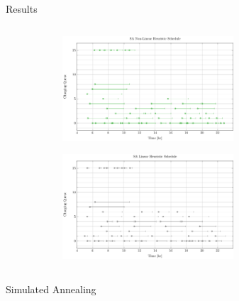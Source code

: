 \documentclass[aspectratio=169,dvipsnames]{beamer}
\begin{document}
\begin{frame}[label={sec:org5001cf8}]{Results}
\begin{columns}
\begin{column}{0.5\columnwidth}
\begin{figure}
\begin{subfigure}[t]{\textwidth}
\centering
    \includegraphics[width=0.7\textwidth]{img/sa-nonlinear/schedule-sa-nonlinear}
\end{subfigure}
\begin{subfigure}[t]{\textwidth}
\centering
    \includegraphics[width=0.7\textwidth]{img/sa-nonlinear/schedule-sa-heuristic}
\end{subfigure}
\end{figure}
\end{column}
\end{columns}
\end{frame}


\begin{frame}[label={sec:orge977bc2}]{}
\centering
\Huge Simulated Annealing
\end{frame}
\end{document}

